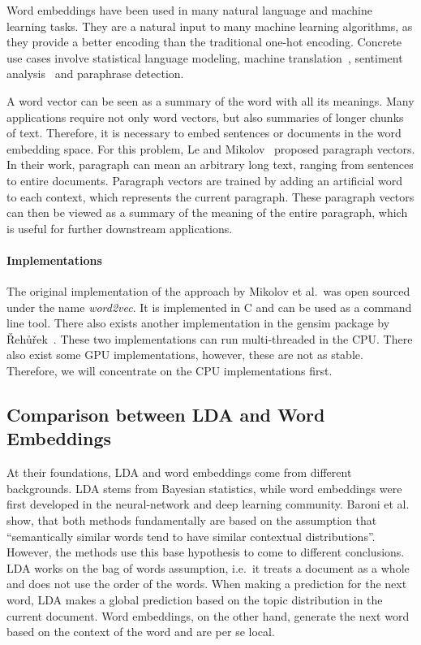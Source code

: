 \documentclass{sig-alternate-05-2015}
\begin{document}
Word embeddings have been used in many natural language and machine learning tasks.
They are a natural input to many machine learning algorithms, as they provide a better encoding than the traditional one-hot encoding.
Concrete use cases involve statistical language modeling, machine translation~\cite{Zou2013}, sentiment analysis~\cite{Maas2011} and paraphrase detection.

A word vector can be seen as a summary of the word with all its meanings.
Many applications require not only word vectors, but also summaries of longer chunks of text.
Therefore, it is necessary to embed sentences or documents in the word embedding space.
For this problem, Le and Mikolov~\cite{Le2014} proposed paragraph vectors.
In their work, paragraph can mean an arbitrary long text, ranging from sentences to entire documents.
Paragraph vectors are trained by adding an artificial word to each context, which represents the current paragraph.
These paragraph vectors can then be viewed as a summary of the meaning of the entire paragraph, which is useful for further downstream applications.

\paragraph{Implementations}
The original implementation of the approach by Mikolov et al.~was open sourced under the name \emph{word2vec}.
It is implemented in C and can be used as a command line tool.
There also exists another implementation in the gensim package by {\v R}eh{\r u}{\v r}ek~\cite{Rehurek2010}.
These two implementations can run multi-threaded in the CPU.
There also exist some GPU implementations, however, these are not as stable.
Therefore, we will concentrate on the CPU implementations first.

\subsection{Comparison between LDA and Word Embeddings}

At their foundations, LDA and word embeddings come from different backgrounds.
LDA stems from Bayesian statistics, while word embeddings were first developed in the neural-network and deep learning community.
Baroni et al.~\cite{Baroni2014} show, that both methods fundamentally are based on the assumption that ``semantically similar words tend to have similar contextual distributions''.
However, the methods use this base hypothesis to come to different conclusions.
LDA works on the bag of words assumption, i.e.\ it treats a document as a whole and does not use the order of the words.
When making a prediction for the next word, LDA makes a global prediction based on the topic distribution in the current document.
Word embeddings, on the other hand, generate the next word based on the context of the word and are per se local.
\end{document}
